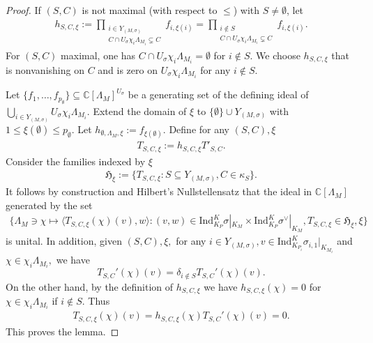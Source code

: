 \documentclass[10pt]{amsart}
\theoremstyle{definition}
\numberwithin{equation}{section}
\numberwithin{equation}{subsection}
\newcommand{\CC}{\mathbb{C}}
\begin{document}
\begin{proof}
    
    If $(S,C)$ is not maximal (with respect to $\leq$) with $S\neq\emptyset$, let
    \begin{align*}
        h_{S,C,\xi}:=\prod_{\substack{i\in Y_{(M,\sigma)}\\ C\cap U_\sigma \chi_i\Lambda_{M_i}\subsetneq C}}f_{i,\xi(i)}=\prod_{\substack{i\notin S\\ C\cap U_\sigma \chi_i\Lambda_{M_i}\subsetneq C}} f_{i,\xi(i)}.
    \end{align*}
    For $(S,C)$ maximal, one has $C\cap U_\sigma\chi_i\Lambda_{M_i} = \emptyset$ for $i\not\in S$. We choose $h_{S,C,\xi}$ that is nonvanishing on $C$ and is zero on $U_\sigma\chi_i\Lambda_{M_i}$ for any $i\not\in S.$ 
    
    Let $\{f_{1},\ldots,f_{p_\emptyset}\}\subseteq \CC[\Lambda_M]^{U_\sigma}$ be a generating set of the defining ideal of $\bigcup_{i\in Y_{(M,\sigma)}}U_\sigma \chi_i\Lambda_{M_i}.$ Extend the domain of $\xi$ to  $\{\emptyset\} \cup Y_{(M,\sigma)}$ with $1\le \xi(\emptyset)\le p_{\emptyset}.$ Let $h_{\emptyset,\Lambda_M,\xi}:=f_{\xi(\emptyset)}.$ Define for any $(S,C),\xi$
    \begin{align*}
       T_{S,C,\xi}:=h_{S,C,\xi}T'_{S,C}.
    \end{align*}
     Consider the families indexed by $\xi$
    \begin{align*}
        \mathfrak{H}_{\xi}:=\{ T_{S,C,\xi}: S\subseteq Y_{(M,\sigma)}, C\in \kappa_S\}.
    \end{align*}
    It follows by construction and Hilbert's Nullstellensatz that the ideal in $\CC[\Lambda_M]$ generated by the set 
    \begin{align*}
        \{\Lambda_{M}\ni \chi \mapsto \langle T_{S,C,\xi}(\chi)(v),w \rangle: (v,w)\in \mathrm{Ind}_{K_{P}}^K \sigma|_{K_M}\times \mathrm{Ind}_{K_{P}}^K \sigma^\lor|_{K_M}, T_{S,C,\xi}\in \mathfrak{H}_\xi, \xi\}
    \end{align*}
    is unital. In addition, given $(S,C),\xi,$ for any $i\in Y_{(M,\sigma)}, v\in \mathrm{Ind}_{K_{P_i}}^K \sigma_{i,1}|_{K_{M_i}}$ and $\chi\in \chi_i\Lambda_{M_i},$ we have $$T_{S,C}'(\chi)(v)=\delta_{i\notin S}T_{S,C}'(\chi)(v).$$
     On the other hand, by the definition of $h_{S,C,\xi}$ we have  $h_{S,C,\xi}(\chi)=0$ for $\chi\in \chi_i\Lambda_{M_i}$ if $i\not\in S$. Thus 
    \begin{align*}
    T_{S,C,\xi}(\chi)(v)=h_{S,C,\xi}(\chi)T_{S,C}'(\chi)(v)=0.
    \end{align*}
    This proves the lemma.
\end{proof}
\end{document}
